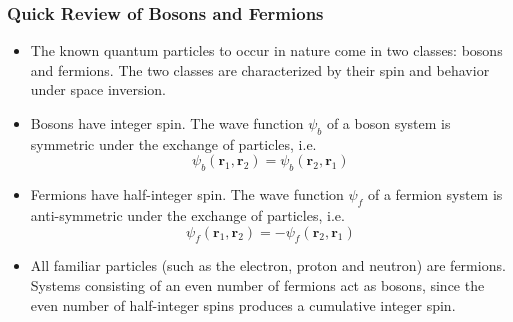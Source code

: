 \documentclass[11pt, a4paper]{article}
\begin{document}
\subsubsection{Quick Review of Bosons and Fermions}
\begin{itemize}
	\item The known quantum particles to occur in nature come in two classes: bosons and fermions. The two classes are characterized by their spin and behavior under space inversion. 
	
	\item Bosons have integer spin. The wave function $ \psi_{b} $ of a boson system is symmetric under the exchange of particles, i.e.
	\begin{equation*}
		\psi_{b}(\bm{r}_{1}, \bm{r}_{2}) = \psi_{b}(\bm{r}_{2}, \bm{r}_{1})
	\end{equation*}
	
	\item Fermions have half-integer spin. The wave function $ \psi_{f} $ of a fermion system is anti-symmetric under the exchange of particles, i.e.
	\begin{equation*}
		\psi_{f}(\bm{r}_{1}, \bm{r}_{2}) = -\psi_{f}(\bm{r}_{2}, \bm{r}_{1})
	\end{equation*}
	
	\item All familiar particles (such as the electron, proton and neutron) are fermions. Systems consisting of an even number of fermions act as bosons, since the even number of half-integer spins produces a cumulative integer spin.
\end{itemize}
\end{document}
